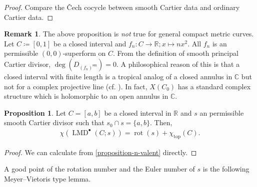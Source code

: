 \documentclass[a4paper,dvipdfmx,reqno,12pt]{amsart}
\theoremstyle{definition}
\newtheorem{proposition}[theorem]{Proposition}
\newtheorem{remark}[theorem]{Remark}
\newcommand{\deq}{\coloneqq}
\newcommand{\opn}[1]{\operatorname{#1}}
\numberwithin{equation}{section}
\begin{document}
\begin{proof}
Compare the \v{C}ech cocycle between smooth Cartier data and ordinary Cartier data.
\end{proof}

\begin{remark}
\label{remark-rotation-closed-interval} 
The above proposition 
is \emph{not} true for general compact metric curves.
Let $C\deq [0,1]$ be a closed interval
and $f_n\colon C\to \mathbb{R};x \mapsto nx^{2}$.
All $f_n$ is an permissible $(0,0)$-superform on $C$.
From the definition of smooth principal Cartier divisor,
$\opn{deg}(D_{(f_n)^{\mathrm{sm}}})=0$. 
A philosophical reason of this is that
a closed interval with finite length is a tropical
analog of a closed annulus in $\mathbb{C}$ but not for
a complex projective line (cf. 
\cite[Definition 3.7]{MR3903579}). In fact, $X(C_0)$ 
has a standard complex structure which is holomorphic to
an open annulus in $\mathbb{C}$.
\end{remark}

\begin{proposition}
\label{proposition-simple-interval-rr}
Let $C=[a,b]$ be a closed interval in $\mathbb{R}$
and $s$ an permissible smooth Cartier divisor 
such that $s_0\cap s=\{a,b\}$. Then,
\begin{align}
\chi(\opn{LMD}^{\bullet}(C;s))=\opn{rot}(s)+
\chi_{\opn{top}}(C).
\end{align}
\end{proposition}
\begin{proof}
We can calculate from 
\cref{proposition-n-valent} directly.
\end{proof}

A good point of the rotation number and the 
Euler number of $s$ is the 
following Meyer--Vietoris type lemma.
\end{document}
